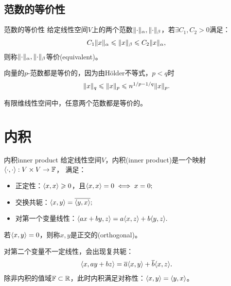 \subsection{范数的等价性}

\begin{definition}
    {范数的等价性}{}
    给定线性空间$V$上的两个范数$\lVert\cdot\rVert_\alpha,\lVert\cdot\rVert_\beta$，若$\exists C_1,C_2 > 0$满足：
    \begin{equation}\label{eq:na-equivalent-norms}
        C_1\lVert x\rVert_\alpha \leqslant \lVert x\rVert_\beta \leqslant C_2\lVert x\rVert_\alpha,
    \end{equation}
    则称$\lVert\cdot\rVert_\alpha,\lVert\cdot\rVert_\beta$等价(equivalent)。
\end{definition}

\begin{corollary}
    向量的$p$-范数都是等价的，因为由H\"older不等式，$p < q$时
    \begin{equation}
        \lVert x\rVert_q \leqslant \lVert x\rVert_p \leqslant n^{1/p-1/q}\lVert x\rVert_p.
    \end{equation}
\end{corollary}

\begin{theorem}
    {}{}
    有限维线性空间中，任意两个范数都是等价的。
\end{theorem}


\section{内积}
\label{sec:inner product}

\begin{definition}
    {内积}{inner product}
    给定线性空间$V$，内积(inner product)是一个映射$\langle\cdot,\cdot\rangle :V \times V \to \mathbb{F}$，
    满足：
    \begin{itemize}
        \item 正定性：$\langle x,x\rangle \geqslant 0$，且$\langle x,x\rangle = 0 \iff x = 0;$
        \item 交换共轭：$\langle x,y\rangle = \overline{\langle y,x\rangle};$
        \item 对第一个变量线性：$\langle ax + by,z\rangle = a\langle x,z\rangle + b\langle y,z\rangle.$
    \end{itemize}
    若$\langle x,y\rangle = 0$，则称$x,y$是正交的(orthogonal)。
\end{definition}

\begin{remark}
    对第二个变量不一定线性，会出现复共轭：
    \begin{equation}\label{eq:na-conjugate-linearity}
        \langle x,ay + bz\rangle = \overline a\langle x,y\rangle + \overline b\langle x,z\rangle.
    \end{equation}
    除非内积的值域$\mathbb{F} \subset \mathbb{R}$，此时内积满足对称性：$\langle x,y\rangle = \langle y,x\rangle$。
\end{remark}

